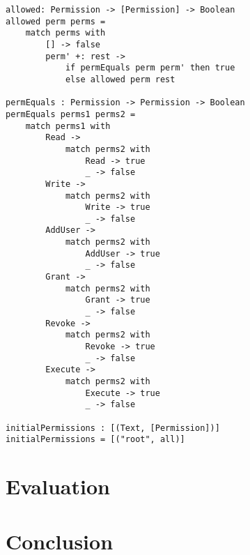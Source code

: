 \documentclass[logo,bsc,singlespacing,parskip]{infthesis}
\begin{document}
\begin{lstlisting}[language=unison]
allowed: Permission -> [Permission] -> Boolean
allowed perm perms =
    match perms with
        [] -> false
        perm' +: rest ->
            if permEquals perm perm' then true
            else allowed perm rest

permEquals : Permission -> Permission -> Boolean
permEquals perms1 perms2 = 
    match perms1 with 
        Read -> 
            match perms2 with 
                Read -> true
                _ -> false
        Write -> 
            match perms2 with 
                Write -> true
                _ -> false
        AddUser -> 
            match perms2 with 
                AddUser -> true
                _ -> false
        Grant ->
            match perms2 with 
                Grant -> true
                _ -> false
        Revoke ->
            match perms2 with 
                Revoke -> true
                _ -> false
        Execute ->
            match perms2 with 
                Execute -> true
                _ -> false

initialPermissions : [(Text, [Permission])]
initialPermissions = [("root", all)]
\end{lstlisting}

\chapter{Evaluation}

\chapter{Conclusion}



\end{document}

